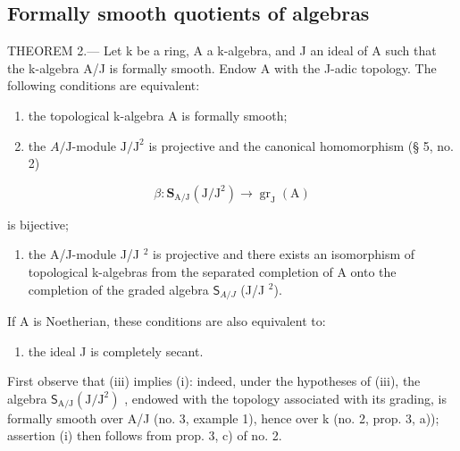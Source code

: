 \subsection{Formally smooth quotients of algebras}

THEOREM 2.--- Let k be a ring, A a k-algebra, and J an ideal of A such that the k-algebra A/J is formally smooth. Endow A with the J-adic topology. The following conditions are equivalent:

\begin{enumerate}
\def\labelenumi{(\roman{enumi})}
\item
  the topological k-algebra A is formally smooth;
\item
  the \(A/\mathrm{J}\)-module \(\mathrm{J}/\mathrm{J}^2\) is projective and the canonical homomorphism (§ 5, no. 2)
\end{enumerate}

\[
\beta : \mathbf {S} _ {\mathrm{A/J}} (\mathrm{J} / \mathrm{J} ^ {2}) \rightarrow \operatorname{gr} _ {\mathrm{J}} (\mathrm{A})
\]

is bijective;

\begin{enumerate}
\def\labelenumi{(\roman{enumi})}
\setcounter{enumi}{2}
\tightlist
\item
  the A/J-module J/J \(^{2}\) is projective and there exists an isomorphism of topological k-algebras from the separated completion of A onto the completion of the graded algebra \(\mathsf{S}_{A/J}\) (J/J \(^{2}\)).
\end{enumerate}

If A is Noetherian, these conditions are also equivalent to:

\begin{enumerate}
\def\labelenumi{(\roman{enumi})}
\setcounter{enumi}{3}
\tightlist
\item
  the ideal J is completely secant.
\end{enumerate}

First observe that (iii) implies (i): indeed, under the hypotheses of (iii), the algebra \(\mathsf{S}_{\mathrm{A}/\mathrm{J}}(\mathrm{J}/\mathrm{J}^{2})\) , endowed with the topology associated with its grading, is formally smooth over A/J (no. 3, example 1), hence over k (no. 2, prop. 3, a)); assertion (i) then follows from prop. 3, c) of no. 2.

